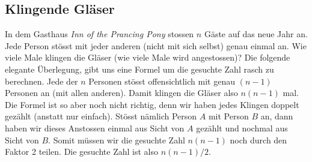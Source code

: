 \subsection{Klingende Gläser}
In dem Gasthaus \textit{Inn of the Prancing Pony} stossen $n$ Gäste auf das neue Jahr an. Jede Person stösst mit jeder anderen (nicht mit sich selbst) genau einmal an. Wie viele Male klingen die Gläser (wie viele Male wird angestossen)? Die folgende elegante Überlegung, gibt uns eine Formel um die gesuchte Zahl rasch zu berechnen. Jede der $n$ Personen stösst offensichtlich mit genau $(n-1)$ Personen an (mit allen anderen). Damit klingen die Gläser also $n(n-1)$ mal. Die Formel ist so aber noch nicht richtig, denn wir haben jedes Klingen doppelt gezählt (anstatt nur einfach). Stösst nämlich Person $A$ mit Person $B$ an, dann haben wir dieses Anstossen einmal aus Sicht von $A$ gezählt und nochmal aus Sicht von $B$. Somit müssen wir die gesuchte Zahl $n(n-1)$ noch durch den Faktor 2 teilen. Die gesuchte Zahl ist also $n(n-1)/2$.
